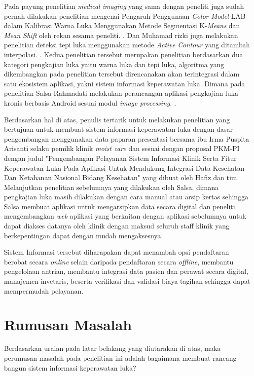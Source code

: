 %
Pada payung penelitian \emph{medical imaging} yang sama dengan peneliti juga sudah pernah dilakukan penelitian mengenai Pengaruh Penggunaan \emph{Color Model} LAB dalam Kalibrasi Warna Luka Menggunakan Metode Segmentasi K-\emph{Means} dan \emph{Mean Shift} oleh rekan sesama peneliti. \citep{Khairunnisa2021pengaruh:8}. Dan Muhamad rizki juga melakukan penelitian deteksi tepi luka menggunakan metode \emph{Active Contour} yang ditambah interpolasi. \citep{Rizki2022deteksi:9}. Kedua penelitian tersebut merupakan penelitian berdasarkan dua kategori pengkajian luka yaitu warna luka dan tepi luka, algoritma yang dikembangkan pada penelitian tersebut direncanakan akan terintegrasi dalam satu ekosistem aplikasi, yakni sistem informasi keperawatan luka. Dimana pada penelitian Salsa Rahmadati melakukan perancangan aplikasi pengkajian luka kronis berbasis Android sesuai modul \emph{image processing}. \citep{Rahmadati2023rancang:4}. 

%
Berdasarkan hal di atas, penulis tertarik untuk melakukan penelitian yang bertujuan untuk membuat sistem informasi keperawatan luka dengan dasar pengembangan menggunakan data paparan presentasi bersama ibu Irma Puspita Arisanti selaku pemilik klinik \emph{moist care} dan sesuai dengan proposal PKM-PI dengan judul "Pengembangan Pelayanan Sistem Informasi Klinik Serta Fitur Keperawatan Luka Pada Aplikasi Untuk Mendukung Integrasi Data Kesehatan Dan Ketahanan Nasional Bidang Kesehatan" yang dibuat oleh Hafiz dan tim. Melanjutkan penelitian sebelumnya yang dilakukan oleh Salsa, dimana pengkajian luka masih dilakukan dengan cara manual atau arsip kertas sehingga Salsa membuat aplikasi untuk mengarsipkan data secara digital dan peneliti mengembangkan \emph{web} aplikasi yang berkaitan dengan aplikasi sebelumnya untuk dapat diakses datanya oleh klinik dengan maksud seluruh staff klinik yang berkepentingan dapat dengan mudah mengaksesnya.
 
Sistem Informasi tersebut diharapakan dapat menambah opsi pendaftaran berobat secara \emph{online} selain daripada pendaftaran secara \emph{offline}, membantu pengelolaan antrian, membantu integrasi data pasien dan perawat secara digital, manajemen invetaris, beserta verifikasi dan validasi biaya tagihan sehingga dapat mempermudah pelayanan.  

\section{Rumusan Masalah}
Berdasarkan uraian pada latar belakang yang diutarakan di atas, maka perumusan masalah pada penelitian ini adalah bagaimana membuat rancang bangun sistem informasi keperawatan luka?

